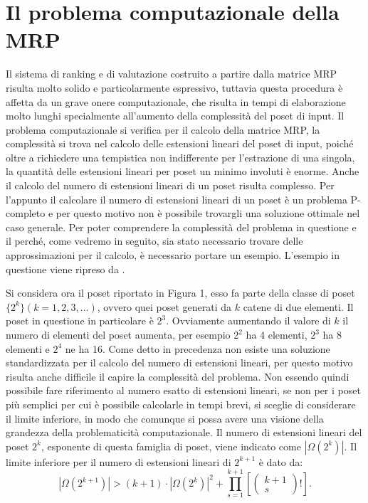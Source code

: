 \documentclass{report}
\begin{document}
\chapter{Il problema computazionale della MRP}
Il sistema di ranking e di valutazione costruito a partire dalla matrice MRP risulta molto solido e particolarmente espressivo, tuttavia questa procedura è affetta da un grave onere computazionale, che risulta in tempi di elaborazione molto lunghi specialmente all'aumento della complessità del poset di input. Il problema computazionale si verifica per il calcolo della matrice MRP, la complessità si trova nel calcolo delle estensioni lineari del poset di input, poiché oltre a richiedere una tempistica non indifferente per l'estrazione di una singola, la quantità delle estensioni lineari per poset un minimo involuti è enorme. Anche il calcolo del numero di estensioni lineari di un poset risulta complesso. Per l'appunto il calcolare il numero di estensioni lineari di un poset è un problema P-completo \citep{brightwell1991} e per questo motivo non è possibile trovargli una soluzione ottimale nel caso generale. Per poter comprendere la complessità del problema in questione e il perché, come vedremo in seguito, sia stato necessario trovare delle approssimazioni per il calcolo, è necessario portare un esempio. L'esempio in questione viene ripreso da \citet{fattore2018}.


Si considera ora il poset riportato in Figura 1, esso fa parte della classe di poset $\{2^k\} (k=1, 2, 3, ...)$, ovvero quei poset generati da $k$ catene di due elementi. Il poset in questione in particolare è $2^3$. Ovviamente aumentando il valore di $k$ il numero di elementi del poset aumenta, per esempio $2^2$ ha 4 elementi, $2^3$ ha 8 elementi e $2^4$ ne ha 16. Come detto in precedenza non esiste una soluzione standardizzata per il calcolo del numero di estensioni lineari, per questo motivo risulta anche difficile il capire la complessità del problema. 
Non essendo quindi possibile fare riferimento al numero esatto di estensioni lineari, se non per i poset più semplici per cui è possibile calcolarle in tempi brevi, si sceglie di considerare il limite inferiore, in modo che comunque si possa avere una visione della grandezza della problematicità computazionale.
Il numero di estensioni lineari del poset $2^k$, esponente di questa famiglia di poset, viene indicato come $|\Omega(2^k)|$. Il limite inferiore per il numero di estensioni lineari di $2^{k+1}$ è dato da:
\[|\Omega(2^{k+1})|>(k+1)\cdot |\Omega(2^k)|^2 + \prod_{s=1}^{k+1}\left[ \left( \begin{array}{c} k+1 \\ s \end{array} \right)! \right].\]
\end{document}
